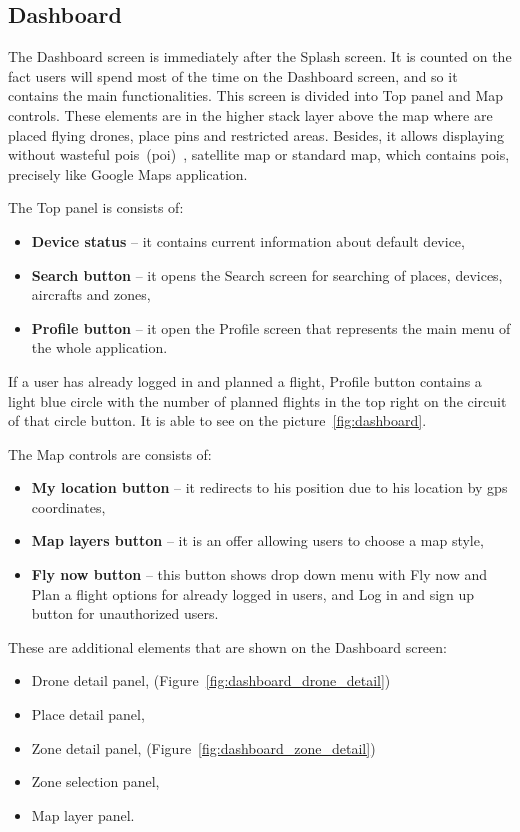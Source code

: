 \subsection{Dashboard}\label{subsec:dashboard2}

The Dashboard screen is immediately after the Splash screen.
It is counted on the fact users will spend most of the time on the Dashboard screen, and so it contains the main functionalities.
This screen is divided into Top panel and Map controls.
These elements are in the higher stack layer above the map where are placed flying drones, place pins and restricted areas.
Besides, it allows displaying without wasteful \acrshort{poi}s~(\acrlong{poi})~\cite{poi}, satellite map or standard map, which contains \acrshort{poi}s, precisely like Google Maps application.

The Top panel is consists of:
\begin{itemize}
    \item \textbf{Device status} -- it contains current information about default device,
    \item \textbf{Search button} -- it opens the Search screen for searching of places, devices, aircrafts and zones,
    \item \textbf{Profile button} -- it open the Profile screen that represents the main menu of the whole application.
\end{itemize}
If a user has already logged in and planned a flight, Profile button contains a light blue circle with the number of planned flights in the top right on the circuit of that circle button.
It is able to see on the picture~\ref{fig:dashboard}.

The Map controls are consists of:
\begin{itemize}
    \item \textbf{My location button} -- it redirects to his position due to his location by \acrshort{gps} coordinates,
    \item \textbf{Map layers button} -- it is an offer allowing users to choose a map style,
    \item \textbf{Fly now button} -- this button shows drop down menu with Fly now and Plan a flight options for already logged in users, and Log in and sign up button for unauthorized users.
\end{itemize}
\newpage
These are additional elements that are shown on the Dashboard screen:
\begin{itemize}
    \item Drone detail panel, (Figure~\ref{fig:dashboard_drone_detail})
    \item Place detail panel,
    \item Zone detail panel, (Figure~\ref{fig:dashboard_zone_detail})
    \item Zone selection panel,
    \item Map layer panel.
\end{itemize}

